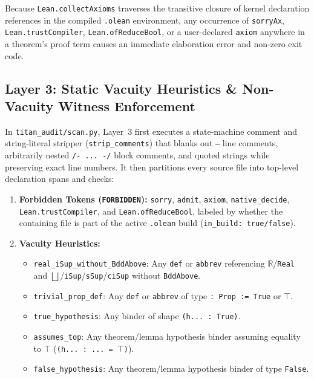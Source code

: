 \documentclass[11pt,a4paper]{article}
\theoremstyle{plain}
\theoremstyle{definition}
\begin{document}
Because \texttt{Lean.collectAxioms} traverses the transitive closure of kernel declaration references in the compiled \texttt{.olean} environment, any occurrence of \texttt{sorryAx}, \texttt{Lean.trustCompiler}, \texttt{Lean.ofReduceBool}, or a user-declared \texttt{axiom} anywhere in a theorem's proof term causes an immediate elaboration error and non-zero exit code.

\subsection{Layer 3: Static Vacuity Heuristics \& Non-Vacuity Witness Enforcement}\label{sec:layer3}

In \texttt{titan\_audit/scan.py}, Layer~3 first executes a state-machine comment and string-literal stripper (\texttt{strip\_comments}) that blanks out \texttt{--} line comments, arbitrarily nested \texttt{/- ... -/} block comments, and quoted strings while preserving exact line numbers. It then partitions every source file into top-level declaration spans and checks:
\begin{enumerate}[nosep]
  \item \textbf{Forbidden Tokens (\texttt{FORBIDDEN}):} \texttt{sorry}, \texttt{admit}, \texttt{axiom}, \texttt{native\_decide}, \texttt{Lean.trustCompiler}, and \texttt{Lean.ofReduceBool}, labeled by whether the containing file is part of the active \texttt{.olean} build (\texttt{in\_build: true/false}).
  \item \textbf{Vacuity Heuristics:}
  \begin{itemize}[nosep]
    \item \texttt{real\_iSup\_without\_BddAbove}: Any \texttt{def} or \texttt{abbrev} referencing $\mathbb{R}$/\texttt{Real} and $\bigsqcup$/\texttt{iSup}/\texttt{sSup}/\texttt{ciSup} without \texttt{BddAbove}.
    \item \texttt{trivial\_prop\_def}: Any \texttt{def} or \texttt{abbrev} of type \texttt{: Prop := True} or $\top$.
    \item \texttt{true\_hypothesis}: Any binder of shape \texttt{(h... : True)}.
    \item \texttt{assumes\_top}: Any theorem/lemma hypothesis binder assuming equality to $\top$ (\texttt{(h... : ... = $\top$)}).
    \item \texttt{false\_hypothesis}: Any theorem/lemma hypothesis binder of type \texttt{False}.
  \end{itemize}
\end{enumerate}
\end{document}
